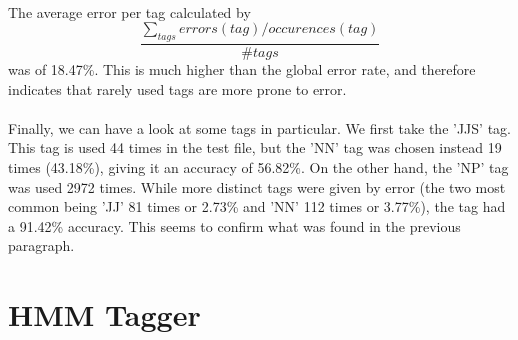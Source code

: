 \documentclass[10pt, a4paper, oneside]{article} %
\begin{document}
\paragraph*{} The average error per tag calculated by
$$ \frac{\sum_{tags}errors(tag)/occurences(tag)}{\# tags}$$
was of 18.47\%. This is much higher than the global error rate, and therefore indicates that rarely used tags are more prone to error.

\paragraph*{}Finally, we can have a look at some tags in particular. We first take the 'JJS' tag. This tag is used 44 times in the test file, but the 'NN' tag was chosen instead 19 times (43.18\%), giving it an accuracy of 56.82\%. On the other hand, the 'NP' tag was used 2972 times. While more distinct tags were given by error (the two most common being 'JJ' 81 times or 2.73\% and 'NN' 112 times or 3.77\%), the tag had a 91.42\% accuracy. This seems to confirm what was found in the previous paragraph.

\section{HMM Tagger}


\pagestyle{fancy} %

\pagebreak
%
%
%
%
%
%
%
%
%
%
%
%
%
%




%
%
%
\end{document}
